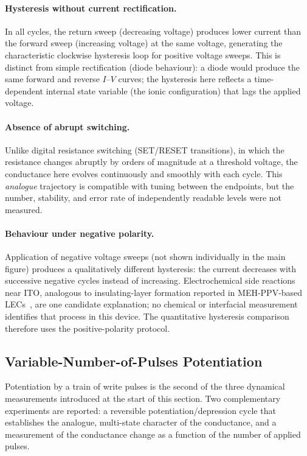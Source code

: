 \documentclass[12pt, twoside]{report}
\begin{document}
\paragraph{Hysteresis without current rectification.} In all cycles, the return sweep (decreasing voltage) produces lower current than the forward sweep (increasing voltage) at the same voltage, generating the characteristic clockwise hysteresis loop for positive voltage sweeps. This is distinct from simple rectification (diode behaviour): a diode would produce the same forward and reverse $I$--$V$ curves; the hysteresis here reflects a time-dependent internal state variable (the ionic configuration) that lags the applied voltage.

\paragraph{Absence of abrupt switching.} Unlike digital resistance switching (SET/RESET transitions), in which the resistance changes abruptly by orders of magnitude at a threshold voltage, the conductance here evolves continuously and smoothly with each cycle. This \textit{analogue} trajectory is compatible with tuning between the endpoints, but the number, stability, and error rate of independently readable levels were not measured.

\paragraph{Behaviour under negative polarity.} Application of negative voltage sweeps (not shown individually in the main figure) produces a qualitatively different hysteresis: the current decreases with successive negative cycles instead of increasing. Electrochemical side reactions near ITO, analogous to insulating-layer formation reported in MEH-PPV-based LECs~\cite{Wagberg2008, Fang2008}, are one candidate explanation; no chemical or interfacial measurement identifies that process in this device. The quantitative hysteresis comparison therefore uses the positive-polarity protocol.

\subsection{Variable-Number-of-Pulses Potentiation}\label{subsec:pulse_potentiation}

Potentiation by a train of write pulses is the second of the three dynamical measurements introduced at the start of this section. Two complementary experiments are reported: a reversible potentiation/depression cycle that establishes the analogue, multi-state character of the conductance, and a measurement of the conductance change as a function of the number of applied pulses.
\end{document}
